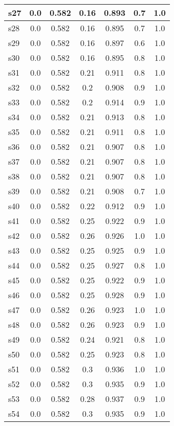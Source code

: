 \documentclass{article}
\begin{document}
\begin{tabular}{|l|c|c|c|c|c|c|}
\hline
s27 &0.0 & 0.582 & 0.16 & 0.893 & 0.7 & 1.0\\
\hline
s28 &0.0 & 0.582 & 0.16 & 0.895 & 0.7 & 1.0\\
\hline
s29 &0.0 & 0.582 & 0.16 & 0.897 & 0.6 & 1.0\\
\hline
s30 &0.0 & 0.582 & 0.16 & 0.895 & 0.8 & 1.0\\
\hline
s31 &0.0 & 0.582 & 0.21 & 0.911 & 0.8 & 1.0\\
\hline
s32 &0.0 & 0.582 & 0.2 & 0.908 & 0.9 & 1.0\\
\hline
s33 &0.0 & 0.582 & 0.2 & 0.914 & 0.9 & 1.0\\
\hline
s34 &0.0 & 0.582 & 0.21 & 0.913 & 0.8 & 1.0\\
\hline
s35 &0.0 & 0.582 & 0.21 & 0.911 & 0.8 & 1.0\\
\hline
s36 &0.0 & 0.582 & 0.21 & 0.907 & 0.8 & 1.0\\
\hline
s37 &0.0 & 0.582 & 0.21 & 0.907 & 0.8 & 1.0\\
\hline
s38 &0.0 & 0.582 & 0.21 & 0.907 & 0.8 & 1.0\\
\hline
s39 &0.0 & 0.582 & 0.21 & 0.908 & 0.7 & 1.0\\
\hline
s40 &0.0 & 0.582 & 0.22 & 0.912 & 0.9 & 1.0\\
\hline
s41 &0.0 & 0.582 & 0.25 & 0.922 & 0.9 & 1.0\\
\hline
s42 &0.0 & 0.582 & 0.26 & 0.926 & 1.0 & 1.0\\
\hline
s43 &0.0 & 0.582 & 0.25 & 0.925 & 0.9 & 1.0\\
\hline
s44 &0.0 & 0.582 & 0.25 & 0.927 & 0.8 & 1.0\\
\hline
s45 &0.0 & 0.582 & 0.25 & 0.922 & 0.9 & 1.0\\
\hline
s46 &0.0 & 0.582 & 0.25 & 0.928 & 0.9 & 1.0\\
\hline
s47 &0.0 & 0.582 & 0.26 & 0.923 & 1.0 & 1.0\\
\hline
s48 &0.0 & 0.582 & 0.26 & 0.923 & 0.9 & 1.0\\
\hline
s49 &0.0 & 0.582 & 0.24 & 0.921 & 0.8 & 1.0\\
\hline
s50 &0.0 & 0.582 & 0.25 & 0.923 & 0.8 & 1.0\\
\hline
s51 &0.0 & 0.582 & 0.3 & 0.936 & 1.0 & 1.0\\
\hline
s52 &0.0 & 0.582 & 0.3 & 0.935 & 0.9 & 1.0\\
\hline
s53 &0.0 & 0.582 & 0.28 & 0.937 & 0.9 & 1.0\\
\hline
s54 &0.0 & 0.582 & 0.3 & 0.935 & 0.9 & 1.0\\
\hline

\end{tabular}
\end{document}

